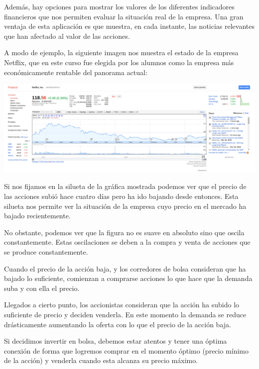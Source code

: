 \documentclass[nochap,palatino,shortheader]{apuntes}
\begin{document}
Además, hay opciones para mostrar los valores de los diferentes indicadores financieros que nos permiten evaluar la situación real de la empresa. Una gran ventaja de esta aplicación es que muestra, en cada instante, las noticias relevantes que han afectado al valor de las acciones.

A modo de ejemplo, la siguiente imagen nos muestra el estado de la empresa Netflix, que en este curso fue elegida por los alumnos como la empresa más económicamente rentable del panorama actual:

\begin{adjustwidth}{-1cm}{-1cm}
\begin{center}
\includegraphics[width=1.2\textwidth]{img/netflix.png}
\label{fig:netflix}
\end{center}
\end{adjustwidth}

Si nos fijamos en la silueta de la gráfica mostrada podemos ver que el precio de las acciones subió hace cuatro días pero ha ido bajando desde entonces. Esta silueta nos permite ver la situación de la empresa cuyo precio en el mercado ha bajado recientemente.

No obstante, podemos ver que la figura no es suave en absoluto sino que oscila constantemente. Estas oscilaciones se deben a la compra y venta de acciones que se produce constantemente.

Cuando el precio de la acción baja, y los corredores de bolsa consideran que ha bajado lo suficiente, comienzan a comprarse acciones lo que hace que la demanda suba y con ella el precio.

Llegados a cierto punto, los accionistas consideran que la acción ha subido lo suficiente de precio y deciden venderla. En este momento la demanda se reduce drásticamente aumentando la oferta con lo que el precio de la acción baja.

Si decidimos invertir en bolsa, debemos estar atentos y tener una óptima conexión de forma que logremos comprar en el momento óptimo (precio mínimo de la acción) y venderla cuando esta alcanza su precio máximo.
\end{document}
